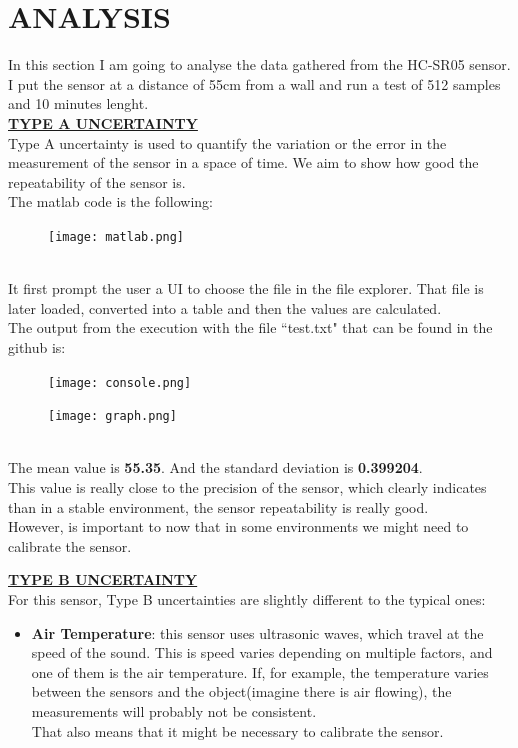 \documentclass[14pt]{article}
\begin{document}
	\section{ANALYSIS}
	\begin{normalsize}
		In this section I am going to analyse the data gathered from the HC-SR05 sensor.\\
		
		\noindent I put the sensor at a distance of 55cm from a wall and run a test of 512 samples and 10 minutes lenght.\vspace{20pt}\\
		
		
		\noindent\underline{\textbf{TYPE A UNCERTAINTY}}\\
		Type A uncertainty is used to quantify the variation or the error in the measurement of the sensor in a space of time. We aim to show how good the repeatability of the sensor is.\\
		
		The matlab code is the following:
		\begin{figure}[h]
			\centering
			\texttt{[image: matlab.png]}
		\end{figure}\\
		It first prompt the user a UI to choose the file in the file explorer. That file is later loaded, converted into a table and then the values are calculated.\\
		The output from the execution with the file ``test.txt" that can be found in the github is:
		\begin{figure}[h]
			\centering
			\texttt{[image: console.png]}
		\end{figure}
		\begin{figure}[h]
			\centering
			\texttt{[image: graph.png]}
		\end{figure}\\
		The mean value is \textbf{55.35}. And the standard deviation is \textbf{0.399204}. \\
		This value is really close to the precision of the sensor, which clearly indicates than in a stable environment, the sensor repeatability is really good.\\
		
		However, is important to now that in some environments we might need to calibrate the sensor.
		
		\noindent\underline{\textbf{TYPE B UNCERTAINTY}}\\
		For this sensor, Type B uncertainties are slightly different to the typical ones:
		\begin{itemize}
			\item \textbf{Air Temperature}: this sensor uses ultrasonic waves, which travel at the speed of the sound. This is speed varies depending on multiple factors, and one of them is the air temperature. If, for example, the temperature varies between the sensors and the object(imagine there is air flowing), the measurements will probably not be consistent.\\
			That also means that it might be necessary to calibrate the sensor.
			

\end{itemize}
\end{normalsize}
\end{document}

